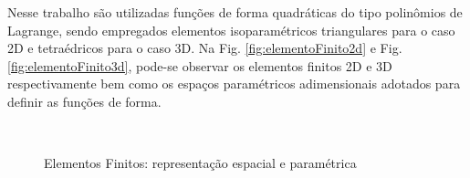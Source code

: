 \documentclass[tese_patricia]{subfiles}%
\begin{document}
Nesse trabalho são utilizadas funções de forma quadráticas do tipo polinômios de Lagrange, sendo empregados elementos isoparamétricos triangulares para o caso 2D e tetraédricos para o caso 3D. Na Fig. \ref{fig:elementoFinito2d} e Fig. \ref{fig:elementoFinito3d}, pode-se observar os elementos finitos 2D e 3D respectivamente bem como os espaços paramétricos adimensionais adotados para definir as funções de forma. 

\begin{figure}[!htb]
	\centering	
	\\
	\caption{Elementos Finitos: representação espacial e paramétrica}
\end{figure}
\end{document}
